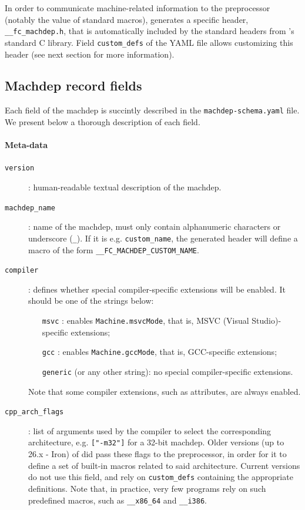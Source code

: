 In order to communicate machine-related information to the preprocessor (notably
the value of standard macros), \framac generates a specific header,
\verb+__fc_machdep.h+, that is automatically included by the standard headers from
\framac's standard C library. Field \verb+custom_defs+ of the YAML file allows
customizing this header (see next section for more information).

\subsection{Machdep record fields}\label{sec:machdep-fields}

Each field of the machdep is succintly described in the
\verb+machdep-schema.yaml+ file.
We present below a thorough description of each field.

\paragraph{Meta-data}
\begin{description}
\item[\texttt{version}]: human-readable textual description of the machdep.
\item[\texttt{machdep\_name}]: name of the machdep, must only contain alphanumeric
  characters or underscore (\verb+_+). If it is e.g. \verb+custom_name+, the generated header will
  define a macro of the form \verb+__FC_MACHDEP_CUSTOM_NAME+.
\item[\texttt{compiler}]: defines whether special compiler-specific extensions
  will be enabled. It should be one of the strings below:
  \begin{itemize}
  \item[\texttt{msvc}]: enables \verb+Machine.msvcMode+, that is,
    MSVC (Visual Studio)-specific extensions;
  \item[\texttt{gcc}]: enables \verb+Machine.gccMode+, that is,
    GCC-specific extensions;
  \item[\texttt{generic}] (or any other string): no special
    compiler-specific extensions.
  \end{itemize}
  Note that some compiler extensions, such as attributes, are always enabled.
\item[\texttt{cpp\_arch\_flags}]: list of arguments used by the compiler to
  select the corresponding architecture, e.g. \verb+["-m32"]+ for a 32-bit
  machdep. Older versions (up to 26.x - Iron) of \framac did pass these flags to the preprocessor,
  in order for it to define a set of built-in macros related to said architecture.
  Current versions do not use this field, and rely on \texttt{\texttt{custom\_defs}}
  containing the appropriate definitions.
  Note that, in practice, very few programs rely on such predefined macros,
  such as \verb+__x86_64+ and \verb+__i386+.
\end{description}
